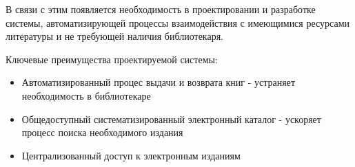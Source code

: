 \documentclass[./intro.tex]{subfiles}
\begin{document}
\par
В связи с этим появляется необходимость в проектировании и разработке системы, автоматизирующей процессы взаимодействия с имеющимися ресурсами литературы и не требующей наличия библиотекаря.
\par
Ключевые преимущества проектируемой системы:
\begin{itemize}
    \item Автоматизированный процес выдачи и возврата книг - устраняет необходимость в библиотекаре\\
    \item Общедоступный систематизированный электронный каталог - ускоряет процесс поиска необходимого издания\\
    \item Централизованный доступ к электронным изданиям
\end{itemize}
\end{document}
